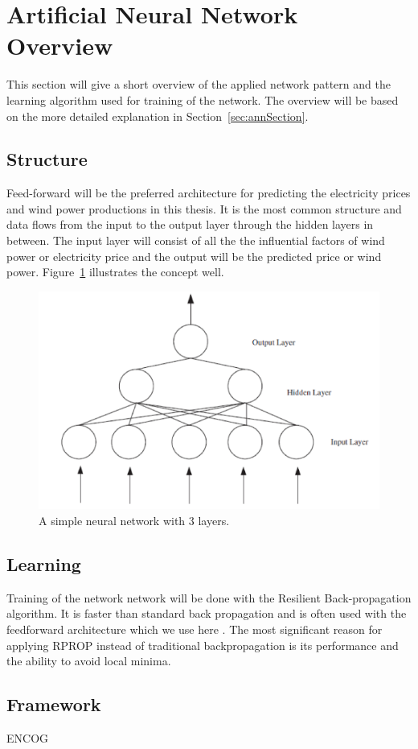 \section{Artificial Neural Network Overview}
This section will give a short overview of the applied network pattern and the learning algorithm used for training of the network. The overview will be based on the more detailed explanation in Section~\ref{sec:annSection}.

\subsection{Structure}
Feed-forward will be the preferred architecture for predicting the electricity prices and wind power productions in this thesis. It is the most common structure and data flows from the input to the output layer through the hidden layers in between. The input layer will consist of all the the influential factors of wind power or electricity price and the output will be the predicted price or wind power. Figure~\ref{fig:overviewAnn} illustrates the concept well.

\begin{figure}[H]
\centering
\includegraphics[width=0.8\linewidth]{billeder/ANN.png}
\caption{A simple neural network with 3 layers. \cite{stockForecasting}}
\label{fig:overviewAnn}
\end{figure}

\subsection{Learning}
Training of the network network will be done with the Resilient Back-propagation algorithm. It is faster than standard back propagation \cite{8,15} and is often used with the feedforward architecture which we use here \cite{14,17}. The most significant reason for applying RPROP instead of traditional backpropagation is its performance and the ability to avoid local minima.

\subsection{Framework}
ENCOG